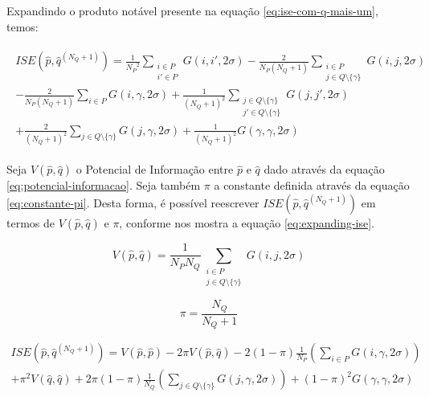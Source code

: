 Expandindo o produto notável presente na equação \ref{eq:ise-com-q-mais-um}, temos:

\begin{gather*}
\begin{split}
ISE(\hat{p}, \hat{q}^{(N_{Q}+1)}) =  \frac{1}{{N_{P}}^2} \sum_{\substack{i \in P \\ i' \in P}} G(i, i', 2\sigma) - \frac{2}{N_{P}(N_{Q}+1)} \sum_{\substack{i \in P \\ j \in Q \setminus \{ \gamma \}}} G(i, j, 2\sigma) \\ -\frac{2}{N_{P}(N_{Q}+1)} \sum_{i \in P} G(i, \gamma, 2\sigma) + \frac{1}{(N_{Q}+1)^2} \sum_{\substack{j \in Q \setminus \{ \gamma \} \\ j' \in Q \setminus \{ \gamma \}}} G(j, j', 2\sigma) \\ + \frac{2}{(N_{Q}+1)^2} \sum_{j \in Q \setminus \{ \gamma \}} G(j, \gamma, 2\sigma) + \frac{1}{(N_{Q}+1)^2} G(\gamma, \gamma, 2\sigma)
\end{split}
\end{gather*}

Seja $V(\hat{p}, \hat{q})$ o Potencial de Informação \citep{Principe:2010:ITL:1855180} entre $\hat{p}$ e $\hat{q}$ dado através da equação \ref{eq:potencial-informacao}. Seja também $\pi$ a constante definida através da equação \ref{eq:constante-pi}. Desta forma, é possível reescrever $ISE(\hat{p}, \hat{q}^{(N_{Q}+1)})$ em termos de $V(\hat{p}, \hat{q})$ e $\pi$, conforme nos mostra a equação \ref{eq:expanding-ise}.

\begin{equation}
V(\hat{p}, \hat{q}) = \frac{1}{N_{P}N_{Q}} \sum_{\substack{i \in P \\ j \in Q \setminus \{ \gamma \} }} G(i, j, 2\sigma)
\label{eq:potencial-informacao}
\end{equation}

\begin{equation}
\pi = \frac{N_Q}{N_{Q}+1}
\label{eq:constante-pi}
\end{equation}

\begin{equation}
\begin{split}
ISE(\hat{p}, \hat{q}^{(N_{Q}+1)}) = V(\hat{p}, \hat{p}) - 2\pi V(\hat{p}, \hat{q}) - 2(1 - \pi) \frac{1}{N_P} \left(\sum_{i \in P} G(i, \gamma, 2\sigma)\right) \\ + \pi^{2}V(\hat{q}, \hat{q}) + 2\pi(1 - \pi) \frac{1}{N_Q} \left(\sum_{j \in Q \setminus \{ \gamma \}} G(j, \gamma, 2\sigma)\right) + (1 - \pi)^2 G(\gamma, \gamma, 2\sigma)
\end{split}
\label{eq:expanding-ise}
\end{equation}

